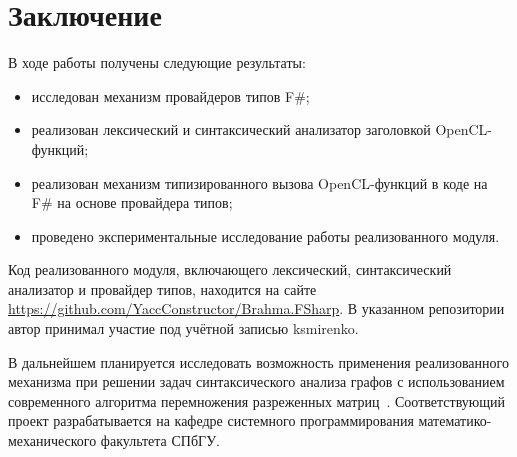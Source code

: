 \section*{Заключение}
В ходе работы получены следующие результаты:
\begin{itemize}
    \item исследован механизм провайдеров типов F\#;
    \item реализован лексический и синтаксический анализатор заголовкой OpenCL-функций;
    \item реализован механизм типизированного вызова OpenCL-функций в коде на F\# на основе провайдера типов;
    \item проведено экспериментальные исследование работы реализованного модуля.
\end{itemize}

Код реализованного модуля, включающего лексический, синтаксический анализатор и провайдер типов, находится на сайте \url{https://github.com/YaccConstructor/Brahma.FSharp}. В указанном репозитории автор принимал участие под учётной записью ksmirenko.

В дальнейшем планируется исследовать возможность применения реализованного механизма при решении задач синтаксического анализа графов с использованием современного алгоритма перемножения разреженных матриц~\cite{SparseMatrixMultiply}. Соответствующий проект разрабатывается на кафедре системного программирования математико-механического факультета СПбГУ.


